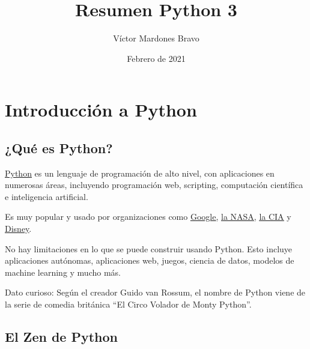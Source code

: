 \documentclass{report}
\title{Resumen Python 3}
\author{Víctor Mardones Bravo}
\date{Febrero de 2021}
\newcommand{\doble}[1]{``#1''}
\begin{document}

\null
\nointerlineskip
\vfill
\let\snewpage \newpage
\let\newpage \relax
  {\centering\def\svgwidth{\columnwidth}
  }
\maketitle
\let \newpage \snewpage
\vfill 
\break

\clearpage

\tableofcontents

\clearpage


\chapter{Introducción a Python}

\section{¿Qué es Python?}

\href{https://www.python.org}{\underline{Python}} es un lenguaje de programación de alto nivel, con aplicaciones en numerosas áreas, incluyendo programación web, scripting, computación científica e inteligencia artificial.

Es muy popular y usado por organizaciones como \href{https://www.google.com}{\underline{Google}}, \href{https://www.nasa.gov}{\underline{la NASA}}, \href{https://www.cia.gov}{\underline{la CIA}} y \href{https://www.disney.com}{\underline{Disney}}.

No hay limitaciones en lo que se puede construir usando Python. Esto incluye aplicaciones autónomas, aplicaciones web, juegos, ciencia de datos, modelos de machine learning y mucho más.

Dato curioso: Según el creador Guido van Rossum, el nombre de Python viene de la serie de comedia británica \doble{El Circo Volador de Monty Python}.

\section{El Zen de Python}
\end{document}
